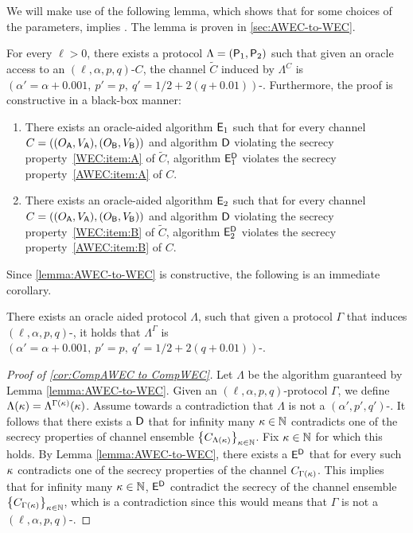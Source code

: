 We will make use of the following lemma, which shows that for some choices of the parameters, \AWEC implies \WEC. The lemma is proven in \cref{sec:AWEC-to-WEC}.

\begin{lemma}\label{lemma:AWEC-to-WEC}
	For every $\ell> 0$, there exists a \ppt protocol $\Lambda = (\mathsf{P}_1,\mathsf{P}_2)$ such that given an oracle access to an $(\ell,\alpha,p,q)$-\AWEC $C$, the channel $\tilde{C}$ induced by $\Lambda^C$ is $(\alpha'=\alpha+0.001,\: p' = p ,\:  q' = 1/2 + 2(q+0.01))$-\WEC.
	Furthermore, the proof is constructive in a black-box manner:
	\begin{enumerate}
		\item There exists an oracle-aided \ppt algorithm $\mathsf{E}_1$ such that for every channel $C = ((O_{\mathsf{A}},{V_{\mathsf{A}}}), (O_{\mathsf{B}},{V_{\mathsf{B}}}))$ and algorithm $\mathsf{D}$ violating the \WEC secrecy property~\ref{WEC:item:A} of $\tilde{C}$, algorithm $\mathsf{E}_1^{\mathsf{D}}$ violates the \AWEC secrecy property~\ref{AWEC:item:A} of $C$.
		
		\item There exists an oracle-aided \ppt algorithm $\mathsf{E}_2$ such that for every channel $C = ((O_{\mathsf{A}},{V_{\mathsf{A}}}), (O_{\mathsf{B}},{V_{\mathsf{B}}}))$ and algorithm $\mathsf{D}$ violating the \WEC secrecy property~\ref{WEC:item:B} of $\tilde{C}$, algorithm $\mathsf{E}_2^{\mathsf{D}}$ violates the \AWEC secrecy property~\ref{AWEC:item:B} of $C$.
	\end{enumerate}
\end{lemma}

Since \cref{lemma:AWEC-to-WEC} is constructive, the following is an immediate corollary.
\begin{corollary}\label{cor:CompAWEC to CompWEC}
There exists an oracle aided \ppt protocol $\Lambda$, such that given a protocol $\Gamma$ that induces $(\ell,\alpha,p,q)$-\CompAWEC, it holds that $\Lambda^\Gamma$ is $(\alpha'=\alpha+0.001,\: p' = p ,\:  q' = 1/2 + 2(q+0.01))$-\CompWEC.  
\end{corollary}
\begin{proof}[Proof of \ref{cor:CompAWEC to CompWEC}]
Let $\Lambda$ be the \ppt algorithm guaranteed  by Lemma \ref{lemma:AWEC-to-WEC}. Given an $(\ell,\alpha,p,q)$-\CompAWEC protocol $\Gamma$, we define $\Lambda(\kappa)={\Lambda^{\Gamma(\kappa)}(\kappa)}$. Assume towards a contradiction that $\Lambda$ is not a $(\alpha',p',q')$-\CompWEC. It follows that there exists a \ppt $\mathsf{D}$ that for infinity many $\kappa\in{\mathbb{N}}$ contradicts one of the \WEC secrecy properties of channel ensemble $\set{C_{\Lambda(\pk)}}_{\pk\in\N}$. Fix $\kappa\in{\mathbb{N}}$ for which this holds. By Lemma \ref{lemma:AWEC-to-WEC}, there exists a \ppt $\mathsf{E}^{\mathsf{D}}$ that for every such $\kappa$  contradicts one of the secrecy properties of the channel $C_{\Gamma(\kappa)}$. This implies that for infinity many $\kappa\in{\mathbb{N}}$, $\mathsf{E}^{\mathsf{D}}$  contradict the secrecy of the channel ensemble $\set{C_{\Gamma(\pk)}}_{\pk\in\N}$, which is a contradiction since this would means that $\Gamma$ is not a $(\ell,\alpha,p,q)$-\CompAWEC.       
\end{proof}



